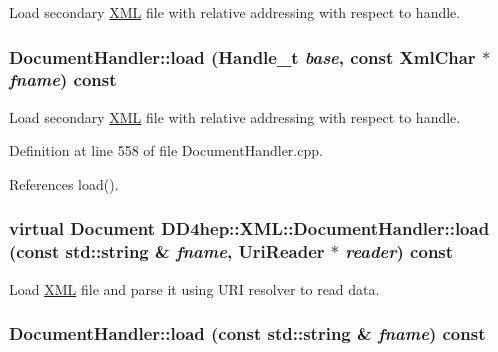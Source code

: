 Load secondary \hyperlink{namespace_d_d4hep_1_1_x_m_l}{XML} file with relative addressing with respect to handle. \hypertarget{class_d_d4hep_1_1_x_m_l_1_1_document_handler_a01cf9428db981f529baf264298f93645}{
\subsubsection[{load}]{ DocumentHandler::load ({\bf Handle\_\-t} {\em base}, \/  const {\bf XmlChar} $\ast$ {\em fname}) const}}
\label{class_d_d4hep_1_1_x_m_l_1_1_document_handler_a01cf9428db981f529baf264298f93645}


Load secondary \hyperlink{namespace_d_d4hep_1_1_x_m_l}{XML} file with relative addressing with respect to handle. 

Definition at line 558 of file DocumentHandler.cpp.

References load().\hypertarget{class_d_d4hep_1_1_x_m_l_1_1_document_handler_a6c1ba9dd9d4ee0e8da6092eecb4973f3}{
\subsubsection[{load}]{\setlength{\rightskip}{0pt plus 5cm}virtual {\bf Document} DD4hep::XML::DocumentHandler::load (const std::string \& {\em fname}, \/  {\bf UriReader} $\ast$ {\em reader}) const}}
\label{class_d_d4hep_1_1_x_m_l_1_1_document_handler_a6c1ba9dd9d4ee0e8da6092eecb4973f3}


Load \hyperlink{namespace_d_d4hep_1_1_x_m_l}{XML} file and parse it using URI resolver to read data. \hypertarget{class_d_d4hep_1_1_x_m_l_1_1_document_handler_afb778f4cf8500ce879b0f4a0c8009be1}{
\subsubsection[{load}]{ DocumentHandler::load (const std::string \& {\em fname}) const}}
\label{class_d_d4hep_1_1_x_m_l_1_1_document_handler_afb778f4cf8500ce879b0f4a0c8009be1}


